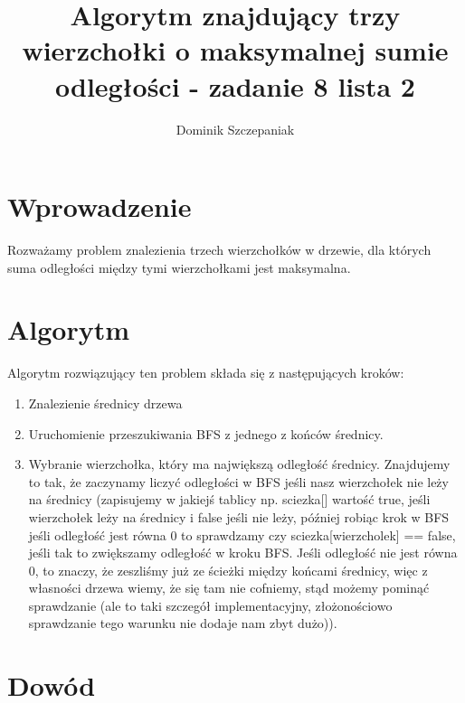 \documentclass{article}
\title{Algorytm znajdujący trzy wierzchołki o maksymalnej sumie odległości - zadanie 8 lista 2}
\author{Dominik Szczepaniak}
\date{}
\theoremstyle{plain}
\begin{document}
\maketitle

\section{Wprowadzenie}
Rozważamy problem znalezienia trzech wierzchołków w drzewie, dla których suma odległości między tymi wierzchołkami jest maksymalna.

\section{Algorytm}
Algorytm rozwiązujący ten problem składa się z następujących kroków:
\begin{enumerate}
    \item Znalezienie średnicy drzewa 
    \item Uruchomienie przeszukiwania BFS z jednego z końców średnicy.
    \item Wybranie wierzchołka, który ma największą odległość średnicy. Znajdujemy to tak, że zaczynamy liczyć odległości w BFS jeśli nasz wierzchołek nie leży na średnicy (zapisujemy w jakiejś tablicy np. sciezka[] wartość true, jeśli wierzchołek leży na średnicy i false jeśli nie leży, później robiąc krok w BFS jeśli odległość jest równa 0 to sprawdzamy czy sciezka[wierzcholek] == false, jeśli tak to zwiększamy odległość w kroku BFS. Jeśli odległość nie jest równa 0, to znaczy, że zeszliśmy już ze ścieżki między końcami średnicy, więc z własności drzewa wiemy, że się tam nie cofniemy, stąd możemy pominąć sprawdzanie (ale to taki szczegół implementacyjny, złożonościowo sprawdzanie tego warunku nie dodaje nam zbyt dużo)).
\end{enumerate}

\section{Dowód}
\end{document}
